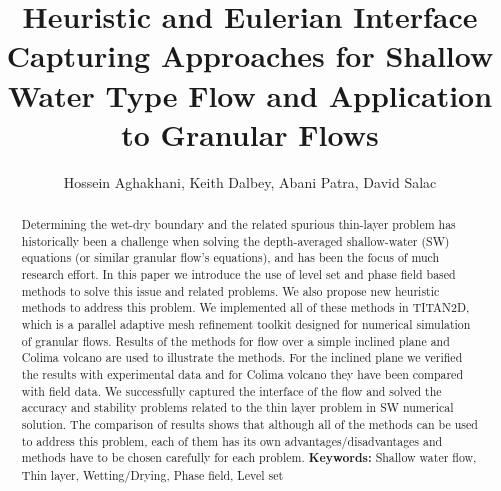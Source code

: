 \documentclass[letterpaper,10pt]{article}
\title{Heuristic and Eulerian Interface Capturing Approaches for Shallow Water Type Flow and Application to Granular Flows }
\author{Hossein Aghakhani, Keith Dalbey, Abani Patra, David Salac}
\date{}
\begin{document}
\maketitle
\begin {abstract}{
Determining the wet-dry boundary and the related spurious thin-layer problem has historically been a challenge when 
solving the depth-averaged shallow-water (SW) equations (or similar granular flow's equations), and has 
been the focus of much research effort. In this paper we introduce the use of level set and phase field based methods to solve this issue and related problems. We also propose new heuristic 
methods to address this problem. We implemented all of these methods in TITAN2D, which is a parallel adaptive mesh refinement toolkit designed for numerical simulation of granular flows. 
Results of the methods for flow over a simple inclined plane and Colima volcano are used to illustrate the methods. For the inclined plane we verified the results with experimental data and for 
Colima volcano they have been compared with field data. We successfully captured the interface of the flow and solved the accuracy and stability problems related to the thin layer problem in 
SW numerical solution. The comparison of results shows that although all of the methods can be used to address this problem, 
each of them has its own advantages/disadvantages and methods have to be chosen carefully for each problem.
\textbf{Keywords:} Shallow water flow, Thin layer, Wetting/Drying, Phase field, Level set}
\end{abstract}
\end{document}
